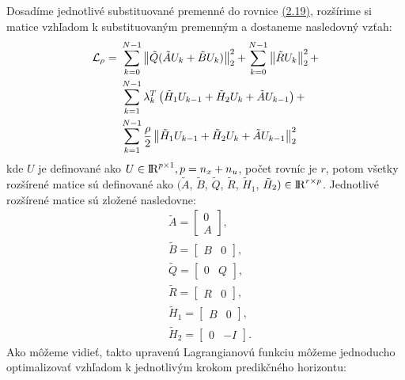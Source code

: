 Dosadíme jednotlivé substituované premenné do rovnice \hyperref[math:RozsirenyLag]{(2.19)}, rozšírime si matice vzhľadom k substituovaným premenným a dostaneme nasledovný vzťah:
\label{math:RozsirenyLag2}
\begin{equation}
\begin{split}
\mathcal{L}_{\rho} =&~ \sum_{k=0}^{N-1}\left\lVert\tilde{Q}(\tilde{A}U_{k}+\tilde{B}U_{k})\right\rVert^{2}_{2}+\sum_{k=0}^{N-1}\left\lVert\tilde{R}U_k\right\rVert^{2}_{2} +\\&~\sum_{k=1}^{N-1}\lambda_{k}^{T}\left(  \tilde{H}_{1}U_{k-1} + \tilde{H}_{2}U_{k} + \tilde{A}U_{k-1} \right) +\\&~\sum_{k=1}^{N-1}\frac{\rho}{2} \left\lVert\tilde{H}_{1}U_{k-1} + \tilde{H}_{2}U_{k} + \tilde{A}U_{k-1}\right\rVert_{2}^{2}
\end{split}
\end{equation}
kde $U$ je definované ako $U \in {\rm I\!R}^{p\times1}, p = n_{x} + n_{u}$, počet rovníc je $r$, potom všetky rozšírené matice sú definované ako $(\tilde{A}$, $\tilde{B}$, $\tilde{Q}$, $\tilde{R}$, $\tilde{H}_{1}$, $\tilde{H}_{2}) \in {\rm I\!R}^{r \times p}$.
 Jednotlivé rozšírené matice sú zložené nasledovne:
\begin{subequations}
	\begin{align}
		&\tilde{A} = \begin{bmatrix}
						0\\
						A
					\end{bmatrix},\\
		&\tilde{B} = \begin{bmatrix}
							B & 0
					 \end{bmatrix},\\
		&\tilde{Q} = \begin{bmatrix}
						0 & Q
					 \end{bmatrix},\\
		&\tilde{R} = \begin{bmatrix}
						R & 0
					\end{bmatrix},\\
		&\tilde{H}_{1} = \begin{bmatrix}
							B & 0
						\end{bmatrix},\\
		&\tilde{H}_{2} = \begin{bmatrix}
							0 & -I
						\end{bmatrix}.
	\end{align}
\end{subequations}
\label{math:Linear_Lagrangean}\noindent
Ako môžeme vidieť, takto upravenú Lagrangianovú funkciu môžeme jednoducho optimalizovať vzhľadom k jednotlivým krokom predikčného horizontu:
